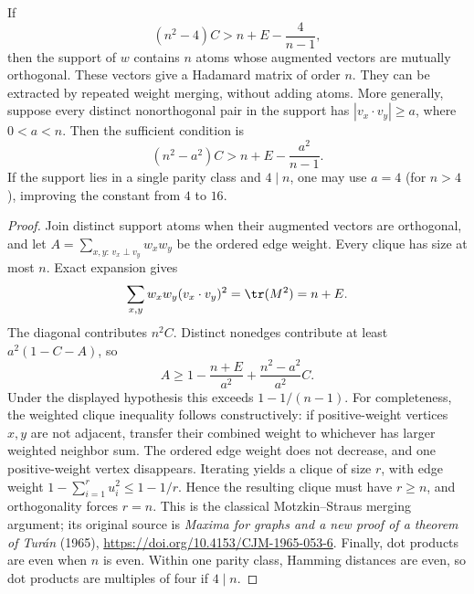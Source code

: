 \begin{theorem}
\label{thm:discrete-rounding}
If
\begin{equation}\label{eq:discrete-certificate}
 (n^2-4)C>n+E-\frac4{n-1},
\end{equation}
then the support of $w$ contains $n$ atoms whose augmented vectors are
mutually orthogonal. These vectors give a Hadamard matrix of order $n$.
They can be extracted by repeated weight merging, without adding atoms.
More generally, suppose every distinct nonorthogonal pair in the support
has $|v_x\cdot v_y|\ge a$, where $0<a<n$. Then the sufficient condition is
\[
 (n^2-a^2)C>n+E-\frac{a^2}{n-1}.
\]
If the support lies in a single parity class and $4\mid n$, one may
use $a=4$ (for $n>4$), improving the constant from $4$ to $16$.
\end{theorem}
\begin{proof}
Join distinct support atoms when their augmented vectors are orthogonal,
and let $A=\sum_{x,y:\,v_x\perp v_y}w_xw_y$ be the ordered edge weight.
Every clique has size at most $n$. Exact expansion gives
\[
 \sum_{x,y}w_xw_y(v_x\cdot v_y)^2=\tr(M^2)=n+E.
\]
The diagonal contributes $n^2C$. Distinct nonedges contribute at least
$a^2(1-C-A)$, so
\[
 A\ge1-\frac{n+E}{a^2}+\frac{n^2-a^2}{a^2}C.
\]
Under the displayed hypothesis this exceeds $1-1/(n-1)$.
For completeness, the weighted clique inequality follows constructively:
if positive-weight vertices $x,y$ are not adjacent, transfer their combined
weight to whichever has larger weighted neighbor sum. The ordered edge
weight does not decrease, and one positive-weight vertex disappears.
Iterating yields a clique of size $r$, with edge weight
$1-\sum_{i=1}^r u_i^2\le1-1/r$. Hence the resulting clique must have
$r\ge n$, and orthogonality forces $r=n$. This is the classical
Motzkin--Straus merging argument; its original source is
\emph{Maxima for graphs and a new proof of a theorem of Tur\'an}
(1965), \url{https://doi.org/10.4153/CJM-1965-053-6}.
Finally, dot products are even when $n$ is even. Within one parity class,
Hamming distances are even, so dot products are multiples of four if
$4\mid n$.
\end{proof}

